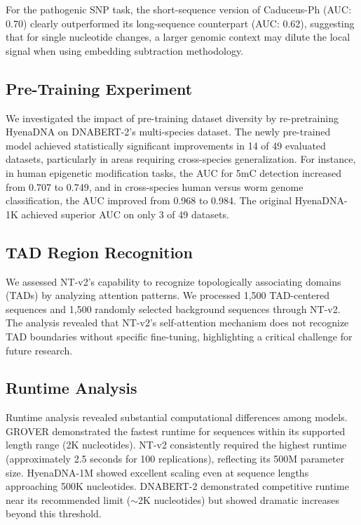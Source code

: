 \documentclass{article}
\begin{document}
For the pathogenic SNP task, the short-sequence version of Caduceus-Ph (AUC: 0.70) clearly outperformed its long-sequence counterpart (AUC: 0.62), suggesting that for single nucleotide changes, a larger genomic context may dilute the local signal when using embedding subtraction methodology.

\subsection{Pre-Training Experiment}

We investigated the impact of pre-training dataset diversity by re-pretraining HyenaDNA on DNABERT-2's multi-species dataset. The newly pre-trained model achieved statistically significant improvements in 14 of 49 evaluated datasets, particularly in areas requiring cross-species generalization. For instance, in human epigenetic modification tasks, the AUC for 5mC detection increased from 0.707 to 0.749, and in cross-species human versus worm genome classification, the AUC improved from 0.968 to 0.984. The original HyenaDNA-1K achieved superior AUC on only 3 of 49 datasets.

\subsection{TAD Region Recognition}

We assessed NT-v2's capability to recognize topologically associating domains (TADs) by analyzing attention patterns. We processed 1,500 TAD-centered sequences and 1,500 randomly selected background sequences through NT-v2. The analysis revealed that NT-v2's self-attention mechanism does not recognize TAD boundaries without specific fine-tuning, highlighting a critical challenge for future research.

\subsection{Runtime Analysis}

Runtime analysis revealed substantial computational differences among models. GROVER demonstrated the fastest runtime for sequences within its supported length range (2K nucleotides). NT-v2 consistently required the highest runtime (approximately 2.5 seconds for 100 replications), reflecting its 500M parameter size. HyenaDNA-1M showed excellent scaling even at sequence lengths approaching 500K nucleotides. DNABERT-2 demonstrated competitive runtime near its recommended limit ($\sim$2K nucleotides) but showed dramatic increases beyond this threshold.
\end{document}
